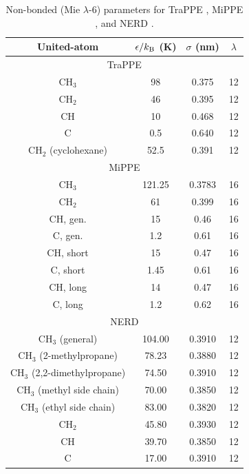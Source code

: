 \documentclass[journal=jced,manuscript=article]{achemso}
\begin{document}
    \begin{table}[h!]
		\caption{Non-bonded (Mie $\lambda$-6) parameters for TraPPE \cite{TraPPE,Martin1999}, MiPPE \cite{Mie,Potoff_branched}, and NERD \cite{NERD}.} \label{tab:nonbonded params}
		\begin{center}
			\begin{tabular}{|c|c|c|c|}
				\hline
				United-atom & $\epsilon/k_{\rm B}$ (K) & $\sigma$ (nm) & $\lambda$ \\ \hline
				\multicolumn{4}{|c|}{TraPPE} \\ \hline
				CH$_3$ & 98 & 0.375 & 12 \\ 
				CH$_2$ & 46 & 0.395 & 12\\ 
				CH & 10 & 0.468 & 12 \\
				C & 0.5 & 0.640 & 12 \\
				CH$_2$ (cyclohexane) & 52.5 & 0.391 & 12 \\
				\hline
				\multicolumn{4}{|c|}{MiPPE} \\ \hline
				CH$_3$ & 121.25 & 0.3783 & 16  \\ 
				CH$_2$ & 61 & 0.399 & 16 \\ 
				CH, gen. & 15 & 0.46 & 16\\
				C, gen. & 1.2 & 0.61 & 16\\
				CH, short & 15 & 0.47 & 16\\
				C, short & 1.45 & 0.61 & 16\\
				CH, long & 14 & 0.47 & 16\\
				C, long & 1.2 & 0.62 & 16\\
				\hline
                \multicolumn{4}{|c|}{NERD} \\ \hline
				CH$_3$ (general) & 104.00  & 0.3910 & 12\\ 
				CH$_3$ (2-methylpropane) & 78.23  & 0.3880 & 12\\ 
				CH$_3$ (2,2-dimethylpropane) & 74.50  & 0.3910 & 12 \\  
				CH$_3$ (methyl side chain) & 70.00 & 0.3850 & 12 \\
				CH$_3$ (ethyl side chain) & 83.00 & 0.3820 & 12 \\
				CH$_2$ & 45.80 & 0.3930 & 12 \\ 
				CH & 39.70 & 0.3850 & 12\\
				C & 17.00 & 0.3910 & 12 \\
				\hline
			\end{tabular}
		\end{center} 
	\end{table}
    
\end{document}
